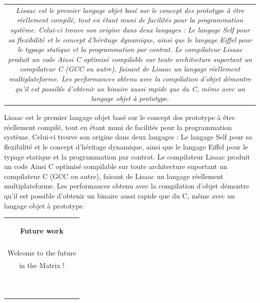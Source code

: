 \documentclass[11pt]{mybook}
\newcommand{\future}[1]{
\noindent\begin{tabular}{|c|}
\colorbox[gray]{0.85}{
  \begin{minipage}{149mm}
  \begin{center}
  {\bf{}Future work}
  \end{center}
  \end{minipage}
}\\
{\begin{minipage}{149mm}
 \textit{#1}
 \end{minipage}
} \\
\colorbox[gray]{0.85}{
  \begin{minipage}{149mm}
  ~~
  \end{minipage}
} \\
\end{tabular}
}
\newcommand{\fr}[1]{
  \if \frenchversion 1
    \if \englishversion 1    
    \vspace{2mm}
    \noindent\begin{tabular}{|c}
      {
        \begin{minipage}{15.5cm}
          \textit{#1}
        \end{minipage}
      }
    \end{tabular}
    \else
    #1
    \fi
  \fi
}
\begin{document}
\fr{
Lisaac est le premier langage objet bas\'e sur le concept des prototype
\`a \^etre r\'eellement compil\'e, tout en \'etant muni de facilit\'es pour la
programmation syst\`eme.  
Celui-ci trouve son origine dans deux langages :
Le langage Self \cite{ungar87b} pour sa flexibilit\'e et le concept
d'h\'eritage dynamique, ainsi que le langage Eiffel pour le typage
statique et la programmation par contrat. 
Le compilateur Lisaac produit un code Ainsi C optimis\'e compilable sur
toute architecture suportant un compilateur C (GCC ou autre), faisant
de Lisaac un langage r\'eellement multiplateforme.
Les performances obtenu avec la compilation d'objet d\'emontre qu'il est
possible d'obtenir un binaire aussi rapide que du C, m\^eme avec un
langage objet \`a prototype. 
}

\future{
Voici le futur !!!\\
Welcome to the future\\
in the Matrix !
}
\end{document}
